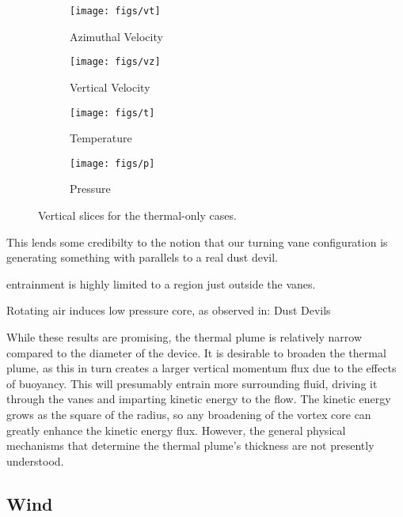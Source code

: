 \begin{figure}[htb]

 \begin{subfigure}{.5\textwidth}
  \centering
  \texttt{[image: figs/vt]}
  \caption{Azimuthal Velocity}
  \label{fig:vt-to}
 \end{subfigure}%
 \begin{subfigure}{.5\textwidth}
  \centering
  \texttt{[image: figs/vz]}
  \caption{Vertical Velocity}
  \label{fig:vz-to}
 \end{subfigure}%


 \begin{subfigure}{.5\textwidth}
  \centering
  \texttt{[image: figs/t]}
  \caption{Temperature}
  \label{fig:t-to}
 \end{subfigure}%
 \begin{subfigure}{.5\textwidth}
  \centering
  \texttt{[image: figs/p]}
  \caption{Pressure}
  \label{fig:p-to}
 \end{subfigure}%

 \caption{Vertical slices for the thermal-only cases.}
 \label{fig:test}
\end{figure}




This lends some credibilty to the notion that our turning vane
configuration is generating something with parallels to a real dust
devil.  


entrainment is highly limited to a region just outside the vanes.

Rotating air induces low pressure core, as observed in:
Dust Devils

%
%
While these results are promising, the thermal plume is relatively
narrow compared to the diameter of the device. It is desirable to
broaden the thermal plume, as this in turn creates a larger vertical
momentum flux due to the effects of buoyancy. This will presumably
entrain more surrounding fluid, driving it through the vanes and
imparting kinetic energy to the flow. The kinetic energy grows as the
square of the radius, so any broadening of the vortex core can greatly
enhance the kinetic energy flux. However, the general physical
mechanisms that determine the thermal plume's thickness are not
presently understood. 

\subsection{Wind}

